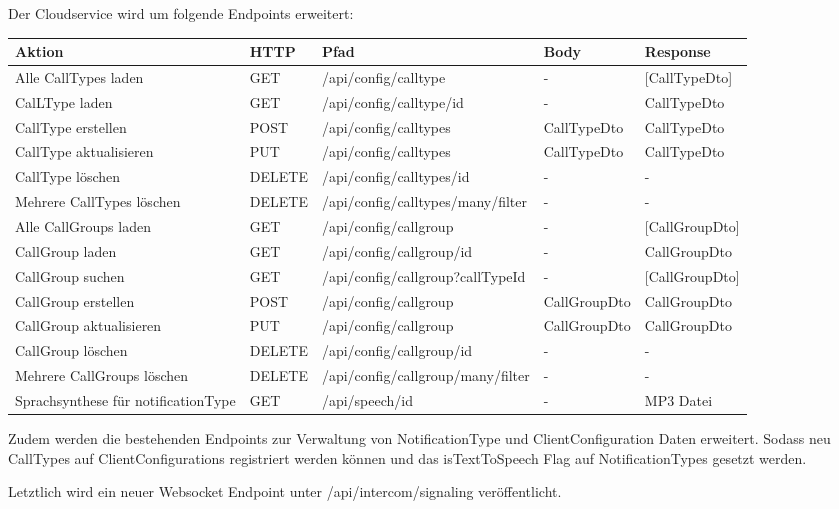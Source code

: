 Der Cloudservice wird um folgende Endpoints erweitert:

\begin{tabularx}{\textwidth}{|p{3cm}|l|l|X|X|}
    \hline
    \textbf{Aktion}                & \textbf{HTTP} & \textbf{Pfad}             & \textbf{Body}   & \textbf{Response} \\
    \hline
    Alle CallTypes laden    & GET          & /api/config/calltype       & - & [CallTypeDto]                 \\
    \hline
    CalLType laden        & GET        & /api/config/calltype/id       & -        & CallTypeDto                 \\
    \hline
    CallType erstellen & POST          & /api/config/calltypes & CallTypeDto & CallTypeDto \\
    \hline
    CallType aktualisieren & PUT          & /api/config/calltypes & CallTypeDto & CallTypeDto \\
    \hline
    CallType löschen & DELETE          & /api/config/calltypes/id & - & - \\
    \hline
    Mehrere CallTypes löschen & DELETE          & /api/config/calltypes/many/filter & - & - \\
    \hline
    Alle CallGroups laden    & GET          & /api/config/callgroup       & - & [CallGroupDto]                 \\
    \hline
    CallGroup laden        & GET        & /api/config/callgroup/id       & -        & CallGroupDto                 \\
    \hline
    CallGroup suchen        & GET        & /api/config/callgroup?callTypeId       & -        & [CallGroupDto]                 \\
    \hline
    CallGroup erstellen & POST          & /api/config/callgroup & CallGroupDto & CallGroupDto \\
    \hline
    CallGroup aktualisieren & PUT          & /api/config/callgroup & CallGroupDto & CallGroupDto \\
    \hline
    CallGroup löschen & DELETE          & /api/config/callgroup/id & - & - \\
    \hline
    Mehrere CallGroups löschen & DELETE          & /api/config/callgroup/many/filter & - & - \\
    \hline
    Sprachsynthese für notificationType        & GET        & /api/speech/id       & -        & MP3 Datei                 \\
    \hline
\end{tabularx}\label{tab:new-api-methods}

Zudem werden die bestehenden Endpoints zur Verwaltung von NotificationType und ClientConfiguration Daten erweitert.
Sodass neu CallTypes auf ClientConfigurations registriert werden können und das isTextToSpeech Flag auf NotificationTypes
gesetzt werden.

Letztlich wird ein neuer Websocket Endpoint unter /api/intercom/signaling veröffentlicht.

\clearpage
